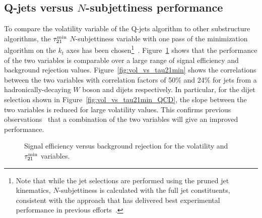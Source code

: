 
\subsection{Q-jets versus $N$-subjettiness performance}
\label{app:qjets:jetvol:nsubj}

To compare the volatility variable of the Q-jets algorithm to other substructure algorithms, the $\tau^{\rm min}_{21}$ $N$-subjettiness variable with one pass of the minimization algorithm on the $k_t$ axes has been chosen\footnote{Note that while the jet selections are performed using the pruned jet kinematics, $N$-subjettiness is calculated with the full jet constituents, consistent with the approach that has delivered best experimental performance in previous efforts~\cite{ATLAS:2012am}.}~\cite{nsub,Thaler:2011gf,ATLAS:2012am}. Figure~\ref{fig:VvsNsubGraph} shows that the performance of the two variables is comparable over a large range of signal efficiency and background rejection values. Figure~\ref{fig:vol_vs_tau21min} shows the correlations between the two variables with correlation factors of 50\% and 24\% for jets from a hadronically-decaying $W$ boson and dijets respectively. In particular, for the dijet selection shown in Figure~\ref{fig:vol_vs_tau21min_QCD}, the slope between the two variables is reduced for large volatility values. This confirms previous observations~\cite{MattHadroWorkshop} that a combination of the two variables will give an improved performance. 

\begin{figure}[htbp]
\centering
{}
\caption{Signal efficiency versus background rejection for the volatility and $\tau^{\rm min}_{21}$ variables.}
\label{fig:VvsNsubGraph}
\end{figure}

